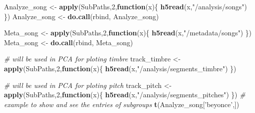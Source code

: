 \documentclass[]{article}
\newenvironment{Shaded}{\begin{snugshade}}{\end{snugshade}}
\newcommand{\KeywordTok}[1]{\textcolor[rgb]{0.13,0.29,0.53}{\textbf{#1}}}
\newcommand{\DecValTok}[1]{\textcolor[rgb]{0.00,0.00,0.81}{#1}}
\newcommand{\StringTok}[1]{\textcolor[rgb]{0.31,0.60,0.02}{#1}}
\newcommand{\CommentTok}[1]{\textcolor[rgb]{0.56,0.35,0.01}{\textit{#1}}}
\newcommand{\ControlFlowTok}[1]{\textcolor[rgb]{0.13,0.29,0.53}{\textbf{#1}}}
\newcommand{\NormalTok}[1]{#1}
\begin{document}
\begin{Shaded}
\begin{Highlighting}[]
\NormalTok{Analyze_song <-}\StringTok{ }\KeywordTok{apply}\NormalTok{(SubPaths,}\DecValTok{2}\NormalTok{,}\ControlFlowTok{function}\NormalTok{(x)\{}
  \KeywordTok{h5read}\NormalTok{(x,}\StringTok{"/analysis/songs"}\NormalTok{)}
\NormalTok{\})}
\NormalTok{Analyze_song <-}\StringTok{ }\KeywordTok{do.call}\NormalTok{(rbind, Analyze_song)}

\NormalTok{Meta_song <-}\StringTok{ }\KeywordTok{apply}\NormalTok{(SubPaths,}\DecValTok{2}\NormalTok{,}\ControlFlowTok{function}\NormalTok{(x)\{}
  \KeywordTok{h5read}\NormalTok{(x,}\StringTok{"/metadata/songs"}\NormalTok{)}
\NormalTok{\})}
\NormalTok{Meta_song <-}\StringTok{ }\KeywordTok{do.call}\NormalTok{(rbind, Meta_song)}

\CommentTok{# will be used in PCA for ploting timbre}
\NormalTok{track_timbre <-}\StringTok{ }\KeywordTok{apply}\NormalTok{(SubPaths,}\DecValTok{2}\NormalTok{,}\ControlFlowTok{function}\NormalTok{(x)\{}
  \KeywordTok{h5read}\NormalTok{(x,}\StringTok{"/analysis/segments_timbre"}\NormalTok{)}
\NormalTok{\})}

\CommentTok{# will be used in PCA for ploting pitch}
\NormalTok{track_pitch <-}\StringTok{ }\KeywordTok{apply}\NormalTok{(SubPaths,}\DecValTok{2}\NormalTok{,}\ControlFlowTok{function}\NormalTok{(x)\{}
  \KeywordTok{h5read}\NormalTok{(x,}\StringTok{"/analysis/segments_pitches"}\NormalTok{)}
\NormalTok{\})}
\CommentTok{# example to show and see the entries of subgroups }
\KeywordTok{t}\NormalTok{(Analyze_song[}\StringTok{'beyonce'}\NormalTok{,])}
\end{Highlighting}
\end{Shaded}
\end{document}
